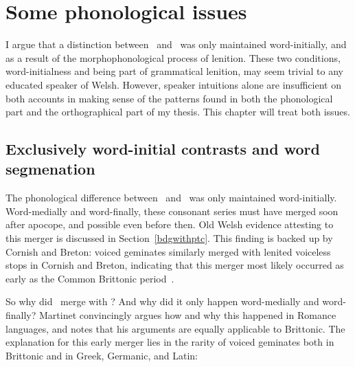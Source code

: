 \chapter{Some phonological issues}
I argue that a distinction between \lT\ and \xD\ was only maintained word-initially, and as a result of the morphophonological process of lenition. These two conditions, word-initialness and being part of grammatical lenition, may seem trivial to any educated speaker of Welsh. However, speaker intuitions alone are insufficient on both accounts in making sense of the patterns found in both the phonological part and the orthographical part of my thesis. This chapter will treat both issues.

\section{Exclusively word-initial contrasts and word segmenation}
\label{sec:excl-word-init}
The phonological difference between \lT\ and \xD\ was only maintained word-initially. Word-medially and word-finally, these consonant series must have merged soon after apocope, and possible even before then. Old Welsh evidence attesting to this merger is discussed in Section~\ref{bdgwithptc}. This finding is backed up by Cornish and Breton: voiced geminates similarly merged with lenited voiceless stops in Cornish and Breton, indicating that this merger most likely occurred as early as the Common Brittonic period~\textcite[31]{schrijver_old_2011}.


So why did \lT\ merge with \xD? And why did it only happen word-medially and word-finally? Martinet convincingly argues how and why this happened in Romance languages, and notes that his arguments are equally applicable to Brittonic. The explanation for this early merger lies in the rarity of voiced geminates both in Brittonic and in Greek, Germanic, and Latin: 

